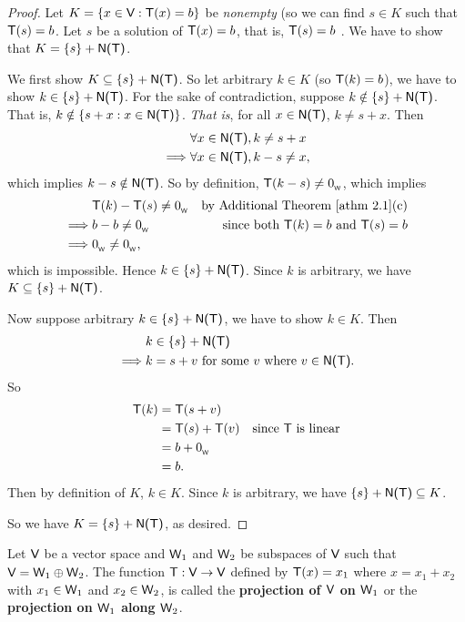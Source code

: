 \begin{proof}
Let \(K = \{ x \in \textsf{V} : \textsf{T}(x) = b \}\) be \emph{nonempty} (so we can find \(s \in K\) such that \(\textsf{T}(s) = b\).
Let \(s\) be a solution of \(\textsf{T}(x) = b\), that is, \(\textsf{T}(s) = b\) .
We have to show that \(K = \{ s \} + \textsf{N(T)}\).

We first show \(K \subseteq \{ s \} + \textsf{N(T)}\).
So let arbitrary \(k \in K\) (so \(\textsf{T}(k) = b\)), we have to show \(k \in \{ s \} + \textsf{N(T)}\).
For the sake of contradiction, suppose \(k \notin \{ s \} + \textsf{N(T)}\).
That is, \(k \notin \{ s + x : x \in \textsf{N(T)} \}\).
\emph{That is}, for all \(x \in \textsf{N(T)}\), \(k \ne s + x\).
Then
\begin{align*}
             & \forall x \in \textsf{N(T)}, k \ne s + x \\
    \implies & \forall x \in \textsf{N(T)}, k - s \ne x,
\end{align*}
which implies \(k - s \notin \textsf{N(T)}\).
So by definition, \(\textsf{T}(k - s) \ne 0_{_{\textsf{W}}}\), which implies 
\begin{align*}
             & \T(k) - \T(s) \ne \OW & \text{by \ATHM{2.1}(c)} \\
    \implies & b - b \ne \OW & \text{since both \(\T(k) = b\) and \(\T(s) = b\)} \\
    \implies & \OW \ne \OW,
\end{align*}
which is impossible.
Hence \(k \in \{ s \} + \textsf{N(T)}\).
Since \(k\) is arbitrary, we have \(K \subseteq \{ s \} + \textsf{N(T)}\).

Now suppose arbitrary \(k \in \{ s \} + \textsf{N(T)}\), we have to show \(k \in K\).
Then
\begin{align*}
             & k \in \{ s \} + \textsf{N(T)} \\
    \implies & k = s + v \text{ for some \(v\) where } v \in \textsf{N(T)}.
\end{align*}
So
\begin{align*}
    \textsf{T}(k) & = \textsf{T}(s + v) \\
          & = \textsf{T}(s) + \textsf{T}(v) & \text{since \(\textsf{T}\) is linear} \\
          & = b + 0_{_{\textsf{W}}} \\
          & = b.
\end{align*}
Then by definition of \(K\), \(k \in K\).
Since \(k\) is arbitrary, we have \(\{ s \} + \textsf{N(T)} \subseteq K\).

So we have \(K = \{ s \} + \textsf{N(T)}\), as desired.
\end{proof}

\begin{additional definition} \label{adef 2.2}
Let \(\textsf{V}\) be a vector space and \(\textsf{W}_1\) and \(\textsf{W}_2\) be subspaces of \(\textsf{V}\) such that \(\textsf{V} = \textsf{W}_1 \oplus \textsf{W}_2\).
The function \(\textsf{T} : \textsf{V} \to \textsf{V}\) defined by \(\textsf{T}(x) = x_1\) where \(x = x_1 + x_2\) with \(x_1 \in \textsf{W}_1\) and \(x_2 \in \textsf{W}_2\), is called the \textbf{projection of \(\textsf{V}\) on \(\textsf{W}_1\)} or the \textbf{projection on \(\textsf{W}_1\) along \(\textsf{W}_2\)}.
\end{additional definition}


